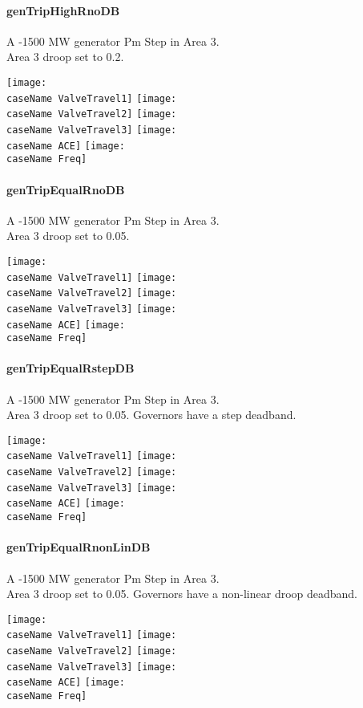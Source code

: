 \documentclass[12pt]{article}
\newcommand{\caseName}{ }
\begin{document}
\renewcommand{\caseName}{genTripHighRnoDB}
\paragraph{\caseName} A -1500 MW generator Pm Step in Area 3. \\
Area 3 droop set to 0.2.

	\texttt{[image: \\caseName ValveTravel1]}
	\texttt{[image: \\caseName ValveTravel2]} 
	\texttt{[image: \\caseName ValveTravel3]} 
	\texttt{[image: \\caseName ACE]} 
	\texttt{[image: \\caseName Freq]} 
	
\pagebreak

\renewcommand{\caseName}{genTripEqualRnoDB}
\paragraph{\caseName} A -1500 MW generator Pm Step in Area 3. \\
Area 3 droop set to 0.05.

	\texttt{[image: \\caseName ValveTravel1]}
	\texttt{[image: \\caseName ValveTravel2]} 
	\texttt{[image: \\caseName ValveTravel3]} 
	\texttt{[image: \\caseName ACE]} 
	\texttt{[image: \\caseName Freq]} 

\pagebreak

\renewcommand{\caseName}{genTripEqualRstepDB}
\paragraph{\caseName} A -1500 MW generator Pm Step in Area 3. \\
Area 3 droop set to 0.05. Governors have a step deadband.

	\texttt{[image: \\caseName ValveTravel1]}
	\texttt{[image: \\caseName ValveTravel2]} 
	\texttt{[image: \\caseName ValveTravel3]} 
	\texttt{[image: \\caseName ACE]} 
	\texttt{[image: \\caseName Freq]} 

\pagebreak

\renewcommand{\caseName}{genTripEqualRnonLinDB}
\paragraph{\caseName} A -1500 MW generator Pm Step in Area 3. \\
Area 3 droop set to 0.05. Governors have a non-linear droop deadband.

	\texttt{[image: \\caseName ValveTravel1]}
	\texttt{[image: \\caseName ValveTravel2]} 
	\texttt{[image: \\caseName ValveTravel3]} 
	\texttt{[image: \\caseName ACE]} 
	\texttt{[image: \\caseName Freq]} 
\end{document}
